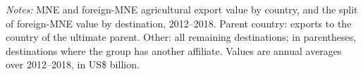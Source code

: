 \begin{table}[htbp]
\centering
\caption{Multinational agricultural exports by exporting country and destination type}
\label{tab:ap_pres}
{\small\setlength{\tabcolsep}{3pt}\setlength{\extrarowheight}{1pt}
}

\begin{minipage}{0.95\linewidth}
\notesize
\vspace{0.6em}
\textit{Notes:} MNE and foreign-MNE agricultural export value by country, and the split of foreign-MNE value by destination, 2012--2018. Parent country: exports to the country of the ultimate parent. Other: all remaining destinations; in parentheses, destinations where the group has another affiliate. Values are annual averages over 2012--2018, in US\$ billion.\\
\srcnote
\end{minipage}
\end{table}

\FloatBarrier

